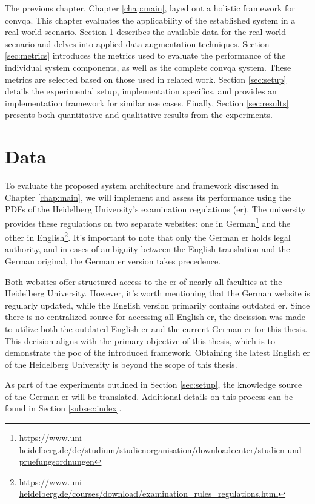 The previous chapter, Chapter \ref{chap:main}, layed out a holistic framework for \gls{convqa}. This chapter evaluates the applicability of the established system in a real-world scenario. Section \ref{sec:data} describes the available data for the real-world scenario and delves into applied data augmentation techniques. Section \ref{sec:metrics} introduces the metrics used to evaluate the performance of the individual system components, as well as the complete \gls{convqa} system. These metrics are selected based on those used in related work. Section \ref{sec:setup} details the experimental setup, implementation specifics, and provides an implementation framework for similar use cases. Finally, Section \ref{sec:results} presents both quantitative and qualitative results from the experiments.

\section{Data}
\label{sec:data}

To evaluate the proposed system architecture and framework discussed in Chapter \ref{chap:main}, we will implement and assess its performance using the PDFs of the Heidelberg University's examination regulations (\gls{er}). The university provides these regulations on two separate websites: one in German\footnote{\url{https://www.uni-heidelberg.de/de/studium/studienorganisation/downloadcenter/studien-und-pruefungsordnungen}} and the other in English\footnote{\url{https://www.uni-heidelberg.de/courses/download/examination_rules_regulations.html}}. It's important to note that only the German \gls{er} holds legal authority, and in cases of ambiguity between the English translation and the German original, the German \gls{er} version takes precedence.

Both websites offer structured access to the \gls{er} of nearly all faculties at the Heidelberg University. However, it's worth mentioning that the German website is regularly updated, while the English version primarily contains outdated \gls{er}. Since there is no centralized source for accessing all English \gls{er}, the decission was made to utilize both the outdated English \gls{er} and the current German \gls{er} for this thesis. This decision aligns with the primary objective of this thesis, which is to demonstrate the \gls{poc} of the introduced framework. Obtaining the latest English \gls{er} of the Heidelberg University is beyond the scope of this thesis.

As part of the experiments outlined in Section \ref{sec:setup}, the knowledge source of the German \gls{er} will be translated. Additional details on this process can be found in Section \ref{subsec:index}.

